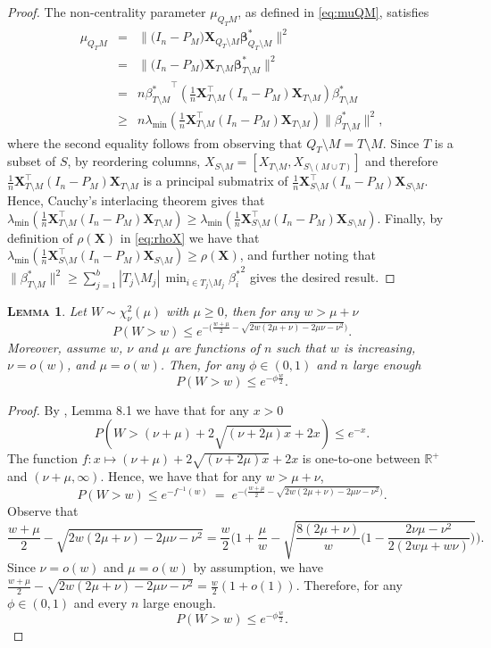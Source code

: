 \documentclass[
  12pt]{article}
\newcommand{\R}{\mathbb{R}}
\newcommand{\bbeta}{\boldsymbol{\beta}}
\newcommand{\bX}{\mathbf{X}}
\newtheorem{lem}[thm]{\textsc{Lemma}}
\begin{document}
\begin{proof} 
The non-centrality parameter $\mu_{Q_TM}$, as defined in \eqref{eq:muQM}, satisfies
\begin{eqnarray*}
    \mu_{Q_TM}&=&\|\big(I_n-P_M\big) \bX_{Q_T\setminus M} \bbeta^*_{Q_T\setminus M}\|^2\\
    &=&\|\big(I_n-P_M\big) \bX_{T\setminus M} \bbeta^*_{T\setminus M}\|^2\\
    &= & n {\beta^*_{T\setminus M}}^\top \left(\tfrac1n \bX_{T\setminus M}^\top(I_n-P_M)\bX_{T\setminus M}\right)\beta^*_{T\setminus M}\\
    &\geq & n\lambda_{\min}\left(\tfrac1n \bX_{T\setminus M}^\top(I_n-P_M)\bX_{T\setminus M}\right)\|\beta^*_{T\setminus M}\|^2,
\end{eqnarray*}
where the second equality follows from observing that $Q_T\setminus M=T\setminus M$. Since $T$ is a subset of $S$, by reordering columns, $X_{S\setminus M}=[X_{T\setminus M},X_{S\setminus (M\cup T)}]$ and therefore $\tfrac1n \bX_{T\setminus M}^\top(I_n-P_M)\bX_{T\setminus M}$ is a principal submatrix of $\tfrac1n \bX_{S\setminus M}^\top(I_n-P_M)\bX_{S\setminus M}$. Hence, Cauchy's interlacing theorem gives that $\lambda_{\min}\left(\tfrac1n \bX_{T\setminus M}^\top(I_n-P_M)\bX_{T\setminus M}\right) \geq \lambda_{\min}\left(\tfrac1n \bX_{S\setminus M}^\top(I_n-P_M)\bX_{S\setminus M}\right)$. Finally, by definition of $\rho(\bX)$ in \eqref{eq:rhoX} we have that
$\lambda_{\min}\left(\tfrac1n \bX_{S\setminus M}^\top(I_n-P_M)\bX_{S\setminus M}\right) \geq \rho(\bX)$, and further noting that $\|\beta^*_{T\setminus M}\|^2\geq \sum_{j=1}^b|T_j\setminus M_j|\,\min_{i\in T_j\setminus M_j}{\beta_{i}^*}^2$ gives the desired result.
\end{proof}

\begin{lem}\label{lemma:s1s3}
Let $W\sim\chi_{\nu}^2(\mu)$ with $\mu \geq 0$, then for any $w>\mu+\nu$
$$P(W > w) \leq e^{-\big(\frac{w+\mu}{2}  - \sqrt{2w( 2 \mu+ \nu)-2 \mu \nu - \nu^2 } \big)}. $$
Moreover, assume $w$, $\nu$ and $\mu$ are functions of $n$ such that $w$ is increasing, $\nu=o(w)$, and $\mu=o(w)$. Then, for any $\phi\in(0,1)$ and $n$ large enough
$$P(W > w)  \leq  e^{-\phi\frac{w}{2}}.$$
\end{lem}

\begin{proof}
By \cite{birge}, Lemma 8.1 we have that for any $x>0$
$$P(W> (\nu+\mu)+2 \sqrt{(\nu+2 \mu) x}+2 x) \leq e^{-x}.$$
The function $f:x\mapsto (\nu+\mu)+2 \sqrt{(\nu+2 \mu) x}+2 x$ is  one-to-one between $\R^+$ and $( \nu+
\mu,\infty)$. 
Hence, we have that for any $w>\mu+\nu$,
$$P(W > w) \leq e^{-f^{-1}(w)} \:=\; e^{-\big(\frac{w+\mu}{2}  - \sqrt{2w(2 \mu+\nu)-2 \mu \nu - \nu^2 }\big) } .$$
Observe that
$$\frac{w+\mu}{2}  - \sqrt{2w( 2 \mu+ \nu)-2 \mu \nu - \nu^2 }= \frac{w}{2}\bigg(1+\frac{\mu}{w} -\sqrt{\frac{8(2 \mu+\nu)}{w}\bigg(1-\frac{2\nu\mu-\nu^2}{2(2w\mu+w\nu)} \bigg)}\bigg).$$
 Since $\nu=o(w)$ and $\mu=o(w)$ by assumption, we have $\frac{w+\mu}{2}  - \sqrt{2w( 2 \mu+ \nu)-2 \mu \nu - \nu^2 }= \frac{w}{2}(1+o(1))$. Therefore, for any $\phi\in(0,1)$ and every $n$ large enough.
$$P(W > w) \leq  e^{-\phi\frac{w}{2}}.$$
\end{proof}
\end{document}
